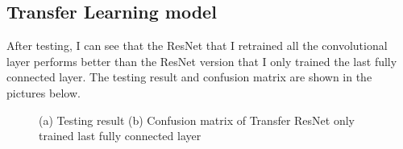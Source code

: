 \documentclass[runningheads]{llncs}
\begin{document}
\subsection{\large\bf Transfer Learning model}
After testing, I can see that the ResNet that I retrained all the convolutional layer performs better than the ResNet version that I only trained the last fully connected layer. The testing result and confusion matrix are shown in the pictures below.
\begin{figure}[H]
    \centering
    \caption{(a) Testing result (b) Confusion matrix of Transfer ResNet only trained last fully connected layer}
    \label{fig:rn1_test}
\end{figure}
\end{document}
